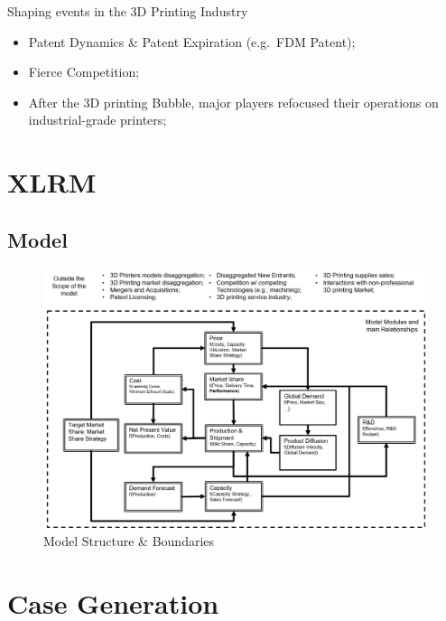 \documentclass[ignorenonframetext,]{beamer}
\providecommand{\tightlist}{%
  \setlength{\itemsep}{0pt}\setlength{\parskip}{0pt}}
\begin{document}
\begin{frame}{Shaping events in the 3D Printing Industry}

\begin{itemize}
\tightlist
\item
  Patent Dynamics \& Patent Expiration (e.g.~FDM Patent);
\item
  Fierce Competition;
\item
  After the 3D printing Bubble, major players refocused their operations
  on industrial-grade printers;
\end{itemize}

\end{frame}

\section{XLRM}\label{xlrm}

\subsection{Model}\label{model}

\begin{figure}
\centering
\includegraphics{images/model-modules-and-boundaries.png}
\caption{Model Structure \& Boundaries}
\end{figure}

\section{Case Generation}\label{case-generation}
\end{document}
